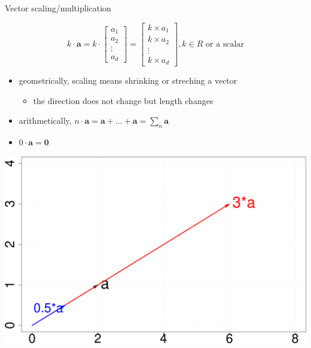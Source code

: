 \documentclass{scrartcl}
\def\tightlist{}
\newcommand{\vv}[1]{\boldsymbol{#1}}
\begin{document}
\begin{frame}{Vector scaling/multiplication}
\protect\hypertarget{vector-scalingmultiplication}{}

\[k\cdot \vv{a} = k \cdot \begin{bmatrix}
           a_1 \\
           a_2 \\
           \vdots\\
           a_d
         \end{bmatrix} = \begin{bmatrix}
           k\times a_1 \\
           k\times a_2 \\
           \vdots\\
           k\times a_d
         \end{bmatrix}, k\in R \text{ or a scalar}\]

\begin{itemize}
\tightlist
\item
  geometrically, scaling means shrinking or streching a vector

  \begin{itemize}
  \tightlist
  \item
    the direction does not change but length changes
  \end{itemize}
\item
  arithmetically,
  \(n\cdot \vv{a} = \vv{a}+\ldots+ \vv{a}=\sum_n \vv{a}\)
\item
  \(0\cdot \vv{a} = \vv{0}\)
\end{itemize}

\begin{center}\includegraphics[width=0.45\linewidth]{math4ml_files/figure-beamer/unnamed-chunk-4-1} \end{center}

\end{frame}
\end{document}

